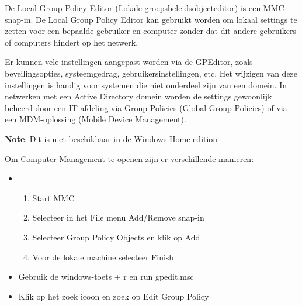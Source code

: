De Local Group Policy Editor (Lokale groepsbeleidsobjecteditor) is een MMC snap-in. De Local Group Policy Editor kan gebruikt worden om lokaal settings te zetten voor een bepaalde gebruiker en computer zonder dat dit andere gebruikers of computers hindert op het netwerk.

Er kunnen vele instellingen aangepast worden via de GPEditor, zoals beveilingsopties, systeemgedrag, gebruikersinstellingen, etc. Het wijzigen van deze instellingen is handig voor systemen die niet onderdeel zijn van een domein. In netwerken met een Active Directory domein worden de settings gewoonlijk beheerd door een IT-afdeling via Group Policies (Global Group Policies) of via een MDM-oplossing (Mobile Device Management).

\textbf{Note}: Dit is niet beschikbaar in de Windows Home-edition


Om Computer Management te openen zijn er verschillende manieren:
\begin{itemize}
\item
	\begin{enumerate}
		\item Start MMC
		\item Selecteer in het File menu Add/Remove snap-in
		\item Selecteer Group Policy Objects en klik op Add
		\item Voor de lokale machine selecteer Finish
	\end{enumerate}
\item Gebruik de windows-toets + r en run gpedit.msc
\item Klik op het zoek icoon en zoek op Edit Group Policy
\end{itemize}

\begin{minipage}[t]{\linewidth}
\raggedright
{}
\end{minipage}

